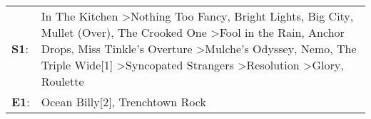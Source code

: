 \begin{supertabular}{p{0.03\textwidth}p{0.92\textwidth}}
 \textbf{S1}:  &  In The Kitchen\textsuperscript{} \textgreater \enspace Nothing Too Fancy\textsuperscript{}, \enspace Bright Lights, Big City\textsuperscript{}, \enspace Mullet (Over)\textsuperscript{}, \enspace The Crooked One\textsuperscript{} \textgreater \enspace Fool in the Rain\textsuperscript{}, \enspace Anchor Drops\textsuperscript{}, \enspace Miss Tinkle's Overture\textsuperscript{} \textgreater \enspace Mulche's Odyssey\textsuperscript{}, \enspace Nemo\textsuperscript{}, \enspace The Triple Wide[1]\textsuperscript{} \textgreater \enspace Syncopated Strangers\textsuperscript{} \textgreater \enspace Resolution\textsuperscript{} \textgreater \enspace Glory\textsuperscript{}, \enspace Roulette\textsuperscript{}  \enspace  \\
 \textbf{E1}:  &                                                                                                                                                                                                                                                                                                                                                                                                                                                                                                                                                                                                                                                           Ocean Billy[2]\textsuperscript{}, \enspace Trenchtown Rock\textsuperscript{}  \enspace  \\
\end{supertabular}
